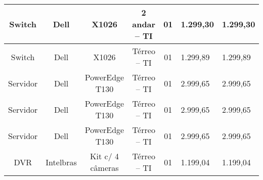 \begin{table}[H]
\begin{tabular}{|c|c|c|c|c|l|l|}
Switch                                                   & Dell                          & X1026                                                                                         & 2 andar – TI         & 01              & 1.299,30                                                                                & 1.299,30                                                                             \\ \hline
Switch                                                   & Dell                          & X1026                                                                                         & Térreo – TI          & 01              & 1.299,89                                                                                & 1.299,89                                                                             \\ \hline
Servidor                                                 & Dell                          & PowerEdge T130                                                                                & Térreo – TI          & 01              & 2.999,65                                                                                & 2.999,65                                                                             \\ \hline
Servidor                                                 & Dell                          & PowerEdge T130                                                                                & Térreo – TI          & 01              & 2.999,65                                                                                & 2.999,65                                                                             \\ \hline
Servidor                                                 & Dell                          & PowerEdge T130                                                                                & Térreo – TI          & 01              & 2.999,65                                                                                & 2.999,65                                                                             \\ \hline
DVR                                                      & Intelbras                     & Kit c/ 4 câmeras                                                                              & Térreo – TI          & 01              & 1.199,04                                                                                & 1.199,04                                                                             \\ \hline

\end{tabular}
\end{table}

